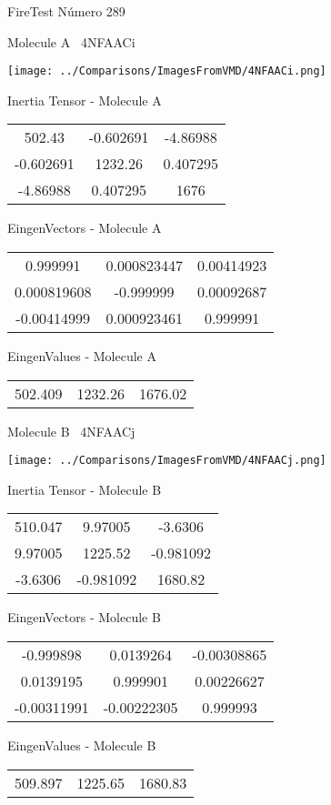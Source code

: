 \vtab[-3cm]
\begin{center}
{\large FireTest \tab Número 289}
\end{center}
\begin{multicols}{2}
\begin{center}

Molecule A \
4NFAACi

\texttt{[image: ../Comparisons/ImagesFromVMD/4NFAACi.png]}

Inertia Tensor - Molecule A \\
\begin{tabular}{|c c c|}
502.43	 & 	-0.602691	 & 	-4.86988	 \\
-0.602691	 & 	1232.26	 & 	0.407295	 \\
-4.86988	 & 	0.407295	 & 	1676
\end{tabular}

\vtab
 EingenVectors - Molecule A     \\
\begin{tabular}{|c c c|}
0.999991	 & 	0.000823447	 & 	0.00414923	 \\
0.000819608	 & 	-0.999999	 & 	0.00092687	 \\
-0.00414999	 & 	0.000923461	 & 	0.999991
\end{tabular}

\vtab
 EingenValues - Molecule A     \\
\begin{tabular}{|c c c|}
502.409	 & 	1232.26	 & 	1676.02	 \\
\end{tabular}
\columnbreak

Molecule B \
4NFAACj

\texttt{[image: ../Comparisons/ImagesFromVMD/4NFAACj.png]}

Inertia Tensor - Molecule B \\
\begin{tabular}{|c c c|}
510.047	 & 	9.97005	 & 	-3.6306	 \\
9.97005	 & 	1225.52	 & 	-0.981092	 \\
-3.6306	 & 	-0.981092	 & 	1680.82
\end{tabular}

\vtab
 EingenVectors - Molecule B     \\
\begin{tabular}{|c c c|}
-0.999898	 & 	0.0139264	 & 	-0.00308865	 \\
0.0139195	 & 	0.999901	 & 	0.00226627	 \\
-0.00311991	 & 	-0.00222305	 & 	0.999993
\end{tabular}

\vtab
 EingenValues - Molecule B     \\
\begin{tabular}{|c c c|}
509.897	 & 	1225.65	 & 	1680.83	 \\
\end{tabular}

\end{center}
\end{multicols}

